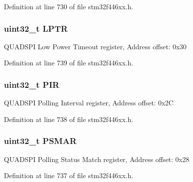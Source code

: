 Definition at line 730 of file stm32f446xx.\+h.

\subsubsection[{\texorpdfstring{L\+P\+TR}{LPTR}}]{ uint32\+\_\+t L\+P\+TR}\hypertarget{struct_q_u_a_d_s_p_i___type_def_ae060e16fd0b193203ddead99622260c1}{}\label{struct_q_u_a_d_s_p_i___type_def_ae060e16fd0b193203ddead99622260c1}
Q\+U\+A\+D\+S\+PI Low Power Timeout register, Address offset\+: 0x30 

Definition at line 739 of file stm32f446xx.\+h.

\subsubsection[{\texorpdfstring{P\+IR}{PIR}}]{ uint32\+\_\+t P\+IR}\hypertarget{struct_q_u_a_d_s_p_i___type_def_aa9e54bfb9deb2d92de2c3f62d33793da}{}\label{struct_q_u_a_d_s_p_i___type_def_aa9e54bfb9deb2d92de2c3f62d33793da}
Q\+U\+A\+D\+S\+PI Polling Interval register, Address offset\+: 0x2C 

Definition at line 738 of file stm32f446xx.\+h.

\subsubsection[{\texorpdfstring{P\+S\+M\+AR}{PSMAR}}]{ uint32\+\_\+t P\+S\+M\+AR}\hypertarget{struct_q_u_a_d_s_p_i___type_def_a986e18db58469e5dd0e756b2b405b805}{}\label{struct_q_u_a_d_s_p_i___type_def_a986e18db58469e5dd0e756b2b405b805}
Q\+U\+A\+D\+S\+PI Polling Status Match register, Address offset\+: 0x28 

Definition at line 737 of file stm32f446xx.\+h.

